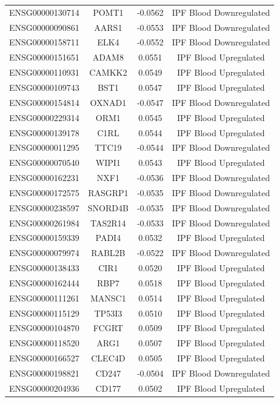 \documentclass[
]{article}
\begin{document}
\begin{singlespace}
\begin{longtable}[t]{lccc}
\addlinespace
ENSG00000130714 & POMT1 & -0.0562 & IPF Blood Downregulated\\
ENSG00000090861 & AARS1 & -0.0553 & IPF Blood Downregulated\\
ENSG00000158711 & ELK4 & -0.0552 & IPF Blood Downregulated\\
ENSG00000151651 & ADAM8 & 0.0551 & IPF Blood Upregulated\\
ENSG00000110931 & CAMKK2 & 0.0549 & IPF Blood Upregulated\\
\addlinespace
ENSG00000109743 & BST1 & 0.0547 & IPF Blood Upregulated\\
ENSG00000154814 & OXNAD1 & -0.0547 & IPF Blood Downregulated\\
ENSG00000229314 & ORM1 & 0.0545 & IPF Blood Upregulated\\
ENSG00000139178 & C1RL & 0.0544 & IPF Blood Upregulated\\
ENSG00000011295 & TTC19 & -0.0544 & IPF Blood Downregulated\\
\addlinespace
ENSG00000070540 & WIPI1 & 0.0543 & IPF Blood Upregulated\\
ENSG00000162231 & NXF1 & -0.0536 & IPF Blood Downregulated\\
ENSG00000172575 & RASGRP1 & -0.0535 & IPF Blood Downregulated\\
ENSG00000238597 & SNORD4B & -0.0535 & IPF Blood Downregulated\\
ENSG00000261984 & TAS2R14 & -0.0533 & IPF Blood Downregulated\\
\addlinespace
ENSG00000159339 & PADI4 & 0.0532 & IPF Blood Upregulated\\
ENSG00000079974 & RABL2B & -0.0522 & IPF Blood Downregulated\\
ENSG00000138433 & CIR1 & 0.0520 & IPF Blood Upregulated\\
ENSG00000162444 & RBP7 & 0.0518 & IPF Blood Upregulated\\
ENSG00000111261 & MANSC1 & 0.0514 & IPF Blood Upregulated\\
\addlinespace
ENSG00000115129 & TP53I3 & 0.0510 & IPF Blood Upregulated\\
ENSG00000104870 & FCGRT & 0.0509 & IPF Blood Upregulated\\
ENSG00000118520 & ARG1 & 0.0507 & IPF Blood Upregulated\\
ENSG00000166527 & CLEC4D & 0.0505 & IPF Blood Upregulated\\
ENSG00000198821 & CD247 & -0.0504 & IPF Blood Downregulated\\
\addlinespace
ENSG00000204936 & CD177 & 0.0502 & IPF Blood Upregulated\\

\end{longtable}
\end{singlespace}
\end{document}
